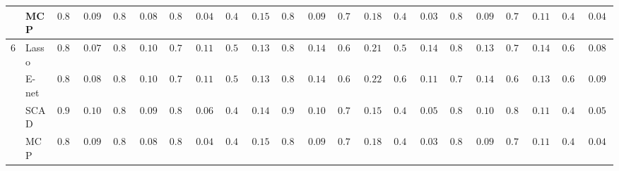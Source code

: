 \begin{tabular}{ll|ll|llllll|llllll|llllll}
	& MCP  & $0.864$ & $0.0938$ & $0.846$ & $0.0846$ & $0.812$ & $0.0477$ & $0.464$ & $0.1501$ & $0.872$ & $0.0965$ & $0.704$ & $0.1831$ & $0.408$ & $0.0394$ & $0.836$ & $0.0959$ & $0.786$ & $0.1146$ & $0.400$ & $0.0402$ \\\hline
	6 & Lasso  & $0.834$ & $0.0755$ & $0.812$ & $0.1018$ & $0.794$ & $0.1188$ & $0.542$ & $0.1372$ & $0.838$ & $0.1469$ & $0.626$ & $0.2196$ & $0.564$ & $0.1404$ & $0.806$ & $0.1347$ & $0.706$ & $0.1406$ & $0.606$ & $0.0874$ \\
	& E-net  & $0.828$ & $0.0854$ & $0.804$ & $0.1024$ & $0.792$ & $0.1169$ & $0.568$ & $0.1325$ & $0.840$ & $0.1449$ & $0.634$ & $0.2203$ & $0.670$ & $0.1115$ & $0.794$ & $0.1462$ & $0.680$ & $0.1303$ & $0.644$ & $0.0925$ \\
	& SCAD  & $0.900$ & $0.1005$ & $0.880$ & $0.0985$ & $0.828$ & $0.0697$ & $0.450$ & $0.1460$ & $0.902$ & $0.1005$ & $0.782$ & $0.1533$ & $0.414$ & $0.0513$ & $0.860$ & $0.1005$ & $0.814$ & $0.1110$ & $0.412$ & $0.0556$ \\
	& MCP  & $0.864$ & $0.0938$ & $0.846$ & $0.0846$ & $0.812$ & $0.0477$ & $0.464$ & $0.1501$ & $0.868$ & $0.0952$ & $0.704$ & $0.1831$ & $0.408$ & $0.0394$ & $0.836$ & $0.0959$ & $0.786$ & $0.1146$ & $0.400$ & $0.0402$ \\
	\hline 
\end{tabular}